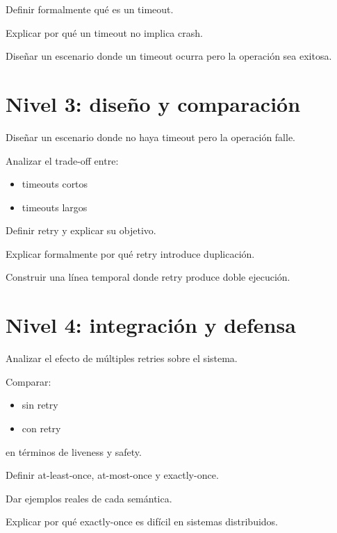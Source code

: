 \documentclass[variant=guia,cover=institutional,mode=screen]{ua-engineering-v6-article}
\begin{document}
\begin{uaexercise}
Definir formalmente qué es un timeout.
\end{uaexercise}

\begin{uaexercise}
Explicar por qué un timeout no implica crash.
\end{uaexercise}

\begin{uaexercise}
Diseñar un escenario donde un timeout ocurra pero la operación sea exitosa.
\end{uaexercise}


\section{Nivel 3: diseño y comparación}
\begin{uaexercise}
Diseñar un escenario donde no haya timeout pero la operación falle.
\end{uaexercise}

\begin{uaexercise}
Analizar el trade-off entre:
\begin{itemize}
\item timeouts cortos
\item timeouts largos
\end{itemize}
\end{uaexercise}

\begin{uaexercise}
Definir retry y explicar su objetivo.
\end{uaexercise}

\begin{uaexercise}
Explicar formalmente por qué retry introduce duplicación.
\end{uaexercise}

\begin{uaexercise}
Construir una línea temporal donde retry produce doble ejecución.
\end{uaexercise}


\section{Nivel 4: integración y defensa}
\begin{uaexercise}
Analizar el efecto de múltiples retries sobre el sistema.
\end{uaexercise}

\begin{uaexercise}
Comparar:
\begin{itemize}
\item sin retry
\item con retry
\end{itemize}
en términos de liveness y safety.
\end{uaexercise}

\begin{uaexercise}
Definir at-least-once, at-most-once y exactly-once.
\end{uaexercise}

\begin{uaexercise}
Dar ejemplos reales de cada semántica.
\end{uaexercise}

\begin{uaexercise}
Explicar por qué exactly-once es difícil en sistemas distribuidos.
\end{uaexercise}
\end{document}
